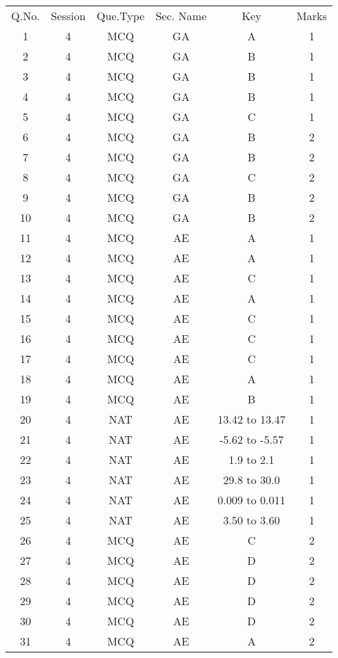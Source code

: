 \begin{tabular}[12pt]{|c|c|c|c|c|c|}
\hline
Q.No. & Session & Que.Type & Sec. Name & Key & Marks \\
1 & 4 & MCQ & GA & A & 1 \\ 
\hline
2 & 4 & MCQ & GA & B & 1 \\ 
\hline
3 & 4 & MCQ & GA & B & 1 \\
\hline
4 & 4 & MCQ & GA & B & 1 \\
\hline
5 & 4 & MCQ & GA & C & 1 \\ 
\hline
6 & 4 & MCQ & GA & B & 2 \\
\hline
7 & 4 & MCQ & GA & B & 2 \\
\hline
8 & 4 & MCQ & GA & C & 2 \\
\hline
9 & 4 & MCQ & GA & B & 2 \\
\hline
10 & 4 & MCQ & GA & B & 2 \\ 
\hline
11 & 4 & MCQ & AE & A & 1 \\
\hline
12 & 4 & MCQ & AE & A & 1 \\ 
\hline
13 & 4 & MCQ & AE & C & 1 \\ 
\hline
14 & 4 & MCQ & AE & A & 1 \\
\hline
15 & 4 & MCQ & AE & C & 1 \\ 
\hline
16 & 4 & MCQ & AE & C & 1 \\ 
\hline
17 & 4 & MCQ & AE & C & 1 \\ 
\hline
18 & 4 & MCQ & AE & A & 1 \\ 
\hline
19 & 4 & MCQ & AE & B & 1 \\
\hline
20 & 4 & NAT & AE & 13.42 to 13.47 & 1 \\
\hline
21 & 4 & NAT & AE & -5.62 to -5.57 & 1 \\ 
\hline
22 & 4 & NAT & AE & 1.9 to 2.1 & 1 \\ 
\hline
23 & 4 & NAT & AE & 29.8 to 30.0 & 1 \\ 
\hline
24 & 4 & NAT & AE & 0.009 to 0.011 & 1 \\ 
\hline
25 & 4 & NAT & AE & 3.50 to 3.60 & 1 \\
\hline
26 & 4 & MCQ & AE & C & 2 \\ 
\hline
27 & 4 & MCQ & AE & D & 2 \\ 
\hline
28 & 4 & MCQ & AE & D & 2 \\
\hline
29 & 4 & MCQ & AE & D & 2 \\
\hline
30 & 4 & MCQ & AE & D & 2 \\
\hline
31 & 4 & MCQ & AE & A & 2 \\

\end{tabular}
